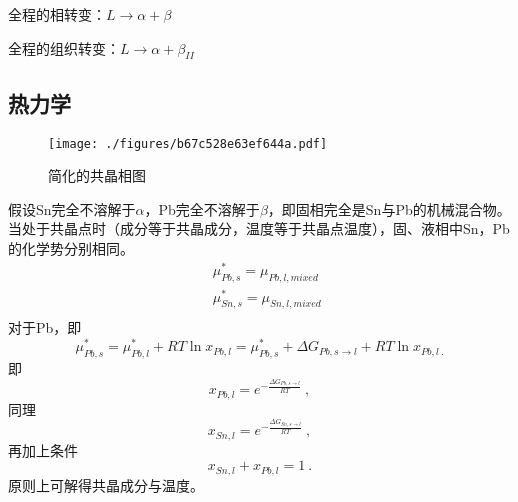 全程的相转变：$L \rightarrow \alpha+\beta$

全程的组织转变：$L \rightarrow \alpha+ \beta_{II}$

\subsection{热力学}
\begin{figure}[ht]
\centering
\texttt{[image: ./figures/b67c528e63ef644a.pdf]}
\caption{简化的共晶相图} \label{fig_EUTECT_5}
\end{figure}
假设Sn完全不溶解于$\alpha$，Pb完全不溶解于$\beta$，即固相完全是Sn与Pb的机械混合物。当处于共晶点时（成分等于共晶成分，温度等于共晶点温度），固、液相中Sn，Pb的化学势分别相同。
\begin{align}
&\mu_{Pb,s}^*=\mu_{Pb,l,mixed}\\
&\mu_{Sn,s}^*=\mu_{Sn,l,mixed}\\~
\end{align}
对于Pb，即
$$\mu_{Pb,s}^*=\mu_{Pb,l}^*+RT \ln x_{Pb,l}=\mu_{Pb,s}^*+\Delta G_{Pb, s\rightarrow l}+RT \ln x_{Pb,l~.}$$
即
\begin{equation}
x_{Pb,l}=e^{-\frac{\Delta G_{Pb, s\rightarrow l}}{RT}}~,
\end{equation}
同理
\begin{equation}
x_{Sn,l}=e^{-\frac{\Delta G_{Sn, s\rightarrow l}}{RT}}~,
\end{equation}
再加上条件
\begin{equation}
x_{Sn,l}+x_{Pb,l}=1~.
\end{equation}
原则上可解得共晶成分与温度。

